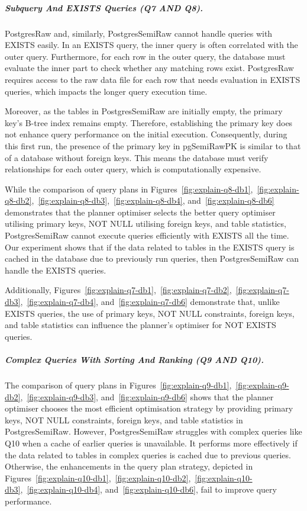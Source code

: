 \subparagraph{Subquery And EXISTS Queries (Q7 AND Q8).}
PostgresRaw and, similarly, PostgresSemiRaw cannot handle queries with EXISTS easily. In an EXISTS query, the inner query is often correlated with the outer query. Furthermore, for each row in the outer query, the database must evaluate the inner part to check whether any matching rows exist. PostgresRaw requires access to the raw data file for each row that needs evaluation in EXISTS queries, which impacts the longer query execution time.

Moreover, as the tables in PostgresSemiRaw are initially empty, the primary key's B-tree index remains empty. Therefore, establishing the primary key does not enhance query performance on the initial execution. Consequently, during this first run, the presence of the primary key in pgSemiRawPK is similar to that of a database without foreign keys. This means the database must verify relationships for each outer query, which is computationally expensive.

While the comparison of query plans in Figures~\ref{fig:explain-q8-db1},~\ref{fig:explain-q8-db2},~\ref{fig:explain-q8-db3},~\ref{fig:explain-q8-db4}, and~\ref{fig:explain-q8-db6} demonstrates that the planner optimiser selects the better query optimiser utilising primary keys, NOT NULL utilising foreign keys, and table statistics, PostgresSemiRaw cannot execute queries efficiently with EXISTS all the time. Our experiment shows that if the data related to tables in the EXISTS query is cached in the database due to previously run queries, then PostgresSemiRaw can handle the EXISTS queries.

Additionally, Figures~\ref{fig:explain-q7-db1},~\ref{fig:explain-q7-db2},~\ref{fig:explain-q7-db3},~\ref{fig:explain-q7-db4}, and~\ref{fig:explain-q7-db6} demonstrate that, unlike EXISTS queries, the use of primary keys, NOT NULL constraints, foreign keys, and table statistics can influence the planner's optimiser for NOT EXISTS queries.

\subparagraph{Complex Queries With Sorting And Ranking (Q9 AND Q10).}
The comparison of query plans in Figures~\ref{fig:explain-q9-db1},~\ref{fig:explain-q9-db2},~\ref{fig:explain-q9-db3}, and~\ref{fig:explain-q9-db6} shows that the planner optimiser chooses the most efficient optimisation strategy by providing primary keys, NOT NULL constraints, foreign keys, and table statistics in PostgresSemiRaw. However, PostgresSemiRaw struggles with complex queries like Q10 when a cache of earlier queries is unavailable. It performs more effectively if the data related to tables in complex queries is cached due to previous queries. Otherwise, the enhancements in the query plan strategy, depicted in Figures~\ref{fig:explain-q10-db1},~\ref{fig:explain-q10-db2},~\ref{fig:explain-q10-db3},~\ref{fig:explain-q10-db4}, and~\ref{fig:explain-q10-db6}, fail to improve query performance.


